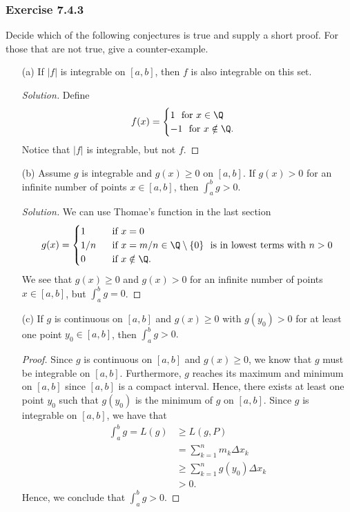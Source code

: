 \subsubsection{Exercise 7.4.3} Decide which of the following conjectures is true and supply a short proof. For those that are not true, give a counter-example.
\begin{enumerate}
	\item[(a)] If \( | f |  \) is integrable on \( [a,b]  \), then \( f  \) is also integrable on this set. 
		\begin{proof}[Solution]
		Define 
		\[  f(x) = 
		\begin{cases}
			1  \ \text{ for } x \in \Q \\
			-1 \ \text{ for } x \notin \Q.
		\end{cases} \]
		Notice that \( | f | \) is integrable, but not \( f \). 
		\end{proof}
	\item[(b)] Assume \( g  \) is integrable and \( g(x) \geq 0  \) on \( [a,b]  \). If \( g(x) > 0  \) for an infinite number of points \( x \in [a,b]  \), then \( \int_{ a }^{ b } g > 0  \).
		\begin{proof}[Solution]
		We can use Thomae's function in the last section 
		\[  g(x) = 
		\begin{cases}
			1 \ &\text{ if } x = 0 \\ 
			1 / n \ &\text{ if } x = m/n \in \Q \setminus \{ 0 \} \ \text{ is in lowest terms with } n > 0 \\
			0 \ &\text{ if } x \notin \Q.
		\end{cases} \]
		We see that \( g(x) \geq 0  \)  and \( g(x) > 0  \) for an infinite number of points \( x \in [a,b]  \), but \( \int_{ a }^{ b } g = 0  \). 
		\end{proof}
	\item[(c)] If \( g  \) is continuous on \( [a,b]  \) and \( g(x) \geq 0  \) with \( g(y_{0}) > 0  \) for at least one point \( y_{0} \in [a,b]  \), then \( \int_{ a }^{ b } g > 0. \)
		\begin{proof}
			Since \( g  \) is continuous on \( [a,b]  \) and \( g(x) \geq 0  \), we know that \( g  \) must be integrable on \( [a,b]  \). Furthermore, \( g  \) reaches its maximum and minimum on \( [a,b]  \) since \( [a,b]  \) is a compact interval. Hence, there exists at least one point \( y_{0} \) such that \( g(y_{0}) \) is the minimum of \( g  \) on \( [a,b] \). Since \( g  \) is integrable on \( [a,b]  \), we have that 
			\begin{align*}
				\int_{ a }^{ b } g  = L(g) &\geq L(g,P) \\
										   &= \sum_{ k=1 }^{ n } m_{k } \Delta x_{k } \\
											&\geq \sum_{ k=1 }^{ n } g(y_{0}) \Delta x_{k } \\ 
											&> 0. 
			\end{align*}
			Hence, we conclude that \( \int_{ a }^{ b } g > 0 \).
		\end{proof}
\end{enumerate}



